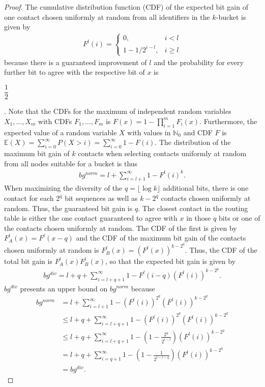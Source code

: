 \documentclass[10pt, conference, compsocconf, letterpaper]{IEEEtran}
\newcommand{\E}{\mathbb{E}}
\begin{document}
\begin{proof}
The cumulative distribution function (CDF) of the expected bit gain of one contact chosen uniformly at random
from all identifiers in the $k$-bucket is given by 
\begin{align*}
F^l(i)=\begin{cases}
0, & i < l \\
1-1/2^{i-l}, & i \geq l
\end{cases}
\end{align*}
because there is a guaranteed improvement of $l$
and the probability for every further bit to agree with the respective bit of $x$ is \begin{footnotesize}$\dfrac{1}{2}$\end{footnotesize}.
Note that the CDFs for the maximum of independent random variables $X_1, \ldots , X_m$
with CDFs $F_1, \ldots , F_m$ is $F(x)= 1 - \prod_{i=1}^m F_i(x)$.
Furthermore, the expected value of a random variable $X$ with values in $\mathbb{N}_0$ and CDF $F$ is
$\E(X)=\sum_{i=0}^\infty P(X > i)=\sum_{i=0}^\infty 1-F(i)$.
The distribution of the maximum bit gain of $k$ contacts when selecting contacts uniformly at random from all nodes
suitable for a bucket is thus
\begin{align*}
bg^{norm} = l+\sum_{i=l+1}^\infty 1 - F^l(i)^k.
\end{align*}
When maximizing the diversity of the $q=\lfloor \log k \rfloor$ additional bits,
there is one contact for each $2^q$ bit sequences as well as $k-2^q$ contacts 
chosen uniformly at random.
Thus, the guaranteed bit gain is $q$. The closest contact in the routing
table is either the one contact guaranteed to agree with $x$
in those $q$ bits or one of the contacts chosen uniformly at random.
The CDF of the first is given by $F^l_A(x)=F^l(x-q)$ and the CDF of the
maximum bit gain of the contacts chosen uniformly at random is $F^l_B(x)=\left(F^l(x)\right)^{k-2^q}$.
Thus, the CDF of the total bit gain is $F^l_A(x)F^l_B(x)$,
so that the expected bit gain is given by 
\begin{align*}
bg^{div} = l+q + \sum_{i=l+q+1}^\infty 1 - F^l(i-q)\left(F^l(i)\right)^{k-2^q}.
\end{align*}
$bg^{div}$ presents an upper bound on $bg^{norm}$ because 
\begin{align*}
bg^{norm} &=  l+\sum_{i=l+1}^\infty 1 - \left(F^l(i)\right)^{2^q}\left(F^l(i)\right)^{k-2^q} \\
&\leq l+q + \sum_{i=l+q+1}^\infty 1 - \left(F^l(i)\right)^{2^q}\left(F^l(i)\right)^{k-2^q} \\
&\leq l+q + \sum_{i=l+q+1}^\infty 1 - \left(1-\frac{2^q}{2^{i-l}}\right)\left(F^l(i)\right)^{k-2^q}  \\
&= l+q + \sum_{i=q+1}^\infty 1 - \left(1-\frac{1}{2^{i-l-q}}\right)\left(F^l(i)\right)^{k-2^q} \\&= bg^{div}.
\end{align*} \end{proof}
\end{document}
